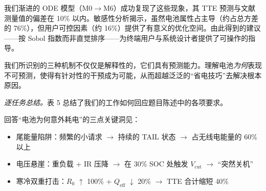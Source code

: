 \documentclass[11pt,a4paper]{ctexart}
\begin{document}
我们渐进的 ODE 模型（M0$\to$M6）成功复现了这些现象，其 TTE 预测与文献测量值的偏差在 10\% 以内。敏感性分析揭示，虽然电池属性占主导（约占总方差的 76\%），但用户可控因素（约 16\%）提供了有意义的优化空间。由此得到的建议——按 Sobol 指数而非直觉排序——为终端用户与系统设计者提供了可操作的指导。

我们所识别的三种机制不仅仅是解释性的，它们具有预测能力。理解电池\textit{为何}表现不可预测，使得有针对性的干预成为可能，从而超越泛泛的“省电技巧”去解决根本原因。

\textit{逐任务总结。}表 5 总结了我们的工作如何回应题目陈述中的各项要求。

回答“电池为何意外耗电”的三点关键洞见：
\begin{itemize}[leftmargin=2em]
\item 尾能量陷阱：频繁的小请求 $\to$ 持续的 TAIL 状态 $\to$ 占无线电能量的 60\% 以上
\item 电压悬崖：重负载 + IR 压降 $\to$ 在 30\% SOC 处触发 $V_{\mathrm{cut}}$ $\to$ “突然关机”
\item 寒冷双重打击：$R_0$ $\uparrow$ 100\% + $Q_{\mathrm{eff}}$ $\downarrow$ 20\% $\to$ TTE 合计缩短 40\%
\end{itemize}
\end{document}
